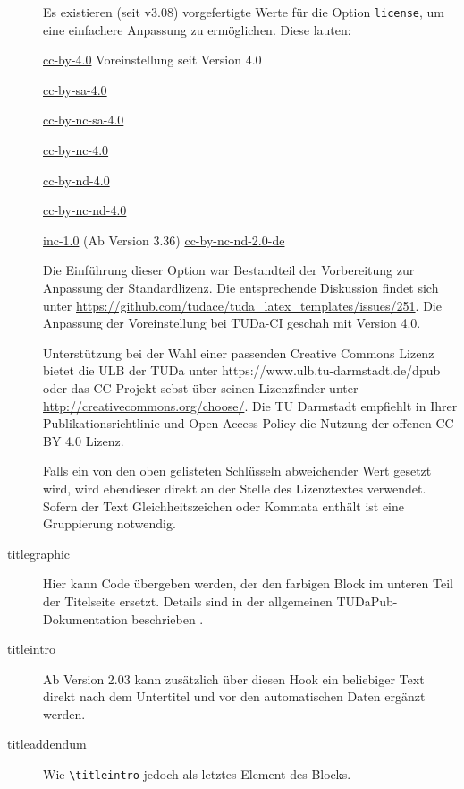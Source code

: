 \documentclass[
	german,%
	accentcolor=9c,%
	ruledheaders=chapter,%
	class=book,%
	thesis={%
			type=dr,
			dr=rernat
		},
	fontsize=11pt,%
	parskip=half-,%
	custommargins=true,%
	marginpar=false,%
]{tudapub}
\newcommand*{\code}[1]{\texttt{#1}}
\let\tbs\textbackslash
\begin{document}
\begin{description}
	      Es existieren (seit v3.08) vorgefertigte Werte für die Option \verb|license|, um eine einfachere Anpassung zu ermöglichen. Diese lauten:

	      \parbox[t]{.5\linewidth}{%
		      \ttfamily
		      \href{https://creativecommons.org/licenses/by/4.0/}{cc-by-4.0} \textnormal{Voreinstellung seit Version 4.0}\par
		      \href{https://creativecommons.org/licenses/by-sa/4.0/}{cc-by-sa-4.0}\par
		      \href{https://creativecommons.org/licenses/by-nc-sa/4.0/}{cc-by-nc-sa-4.0}\par
		      \href{https://creativecommons.org/licenses/by-nc-/4.0/}{cc-by-nc-4.0}\par
	      }%
	      \parbox[t]{.5\linewidth}{
		      \ttfamily
		      \href{https://creativecommons.org/licenses/by-nd/4.0/}{cc-by-nd-4.0}\par
		      \href{https://creativecommons.org/licenses/by-nc-nd/4.0/}{cc-by-nc-nd-4.0}\par
		      \href{https://rightsstatements.org/page/InC/1.0/}{inc-1.0}\textnormal{ (Ab Version 3.36)}
		      \href{https://creativecommons.org/licenses/by-nc-nd/2.0/}{cc-by-nc-nd-2.0-de}\par
	      }

	      Die Einführung dieser Option war Bestandteil der Vorbereitung zur Anpassung der Standardlizenz.
	      Die entsprechende Diskussion findet sich unter \url{https://github.com/tudace/tuda_latex_templates/issues/251}. Die Anpassung der Voreinstellung bei TUDa-CI geschah mit Version 4.0.

	      Unterstützung bei der Wahl einer passenden Creative Commons Lizenz bietet die ULB der TUDa unter https://www.ulb.tu-darmstadt.de/dpub  oder  das CC-Projekt sebst über seinen Lizenzfinder unter \url{http://creativecommons.org/choose/}.
	      Die TU Darmstadt empfiehlt in Ihrer Publikationsrichtlinie und Open-Access-Policy die Nutzung der offenen CC BY 4.0 Lizenz.

	      Falls ein von den oben gelisteten Schlüsseln abweichender Wert gesetzt wird, wird ebendieser direkt an der Stelle des Lizenztextes verwendet. Sofern der Text Gleichheitszeichen oder Kommata enthält ist eine Gruppierung notwendig.
	\item[titlegraphic] Hier kann Code übergeben werden, der den farbigen Block im unteren Teil der Titelseite ersetzt. Details sind in der allgemeinen TUDaPub-Dokumentation beschrieben \cite{tudapub}.
	\item[titleintro] Ab Version 2.03 kann zusätzlich über diesen Hook ein beliebiger Text direkt nach dem Untertitel und vor den automatischen Daten ergänzt werden.
	\item[titleaddendum] Wie \code{\tbs{}titleintro} jedoch als letztes Element des Blocks.
\end{description}
\end{document}
